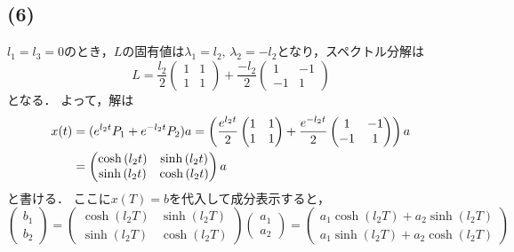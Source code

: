 \documentclass[a4paper,11pt]{jsarticle}
\begin{document}
\subsection*{(6)}
$l_1=l_3=0$のとき，$L$の固有値は$\lambda_1=l_2,\,\lambda_2=-l_2$となり，スペクトル分解は
\begin{equation}
  L = 
  \frac{l_2}{2}\left(
  \begin{matrix}
    1 & 1 \\
    1 & 1 
  \end{matrix}
  \right) + 
  \frac{-l_2}{2}\left(
  \begin{matrix}
    1 & -1 \\
    -1 & 1
  \end{matrix}
  \right)
\end{equation}
となる．
よって，解は
\begin{align}
  x(t) &= (e^{l_2 t}P_1 + e^{-l_2 t}P_2)a 
  = \left(\frac{e^{l_2 t}}{2}\left(
  \begin{matrix}
    1 & 1 \\
    1 & 1 
  \end{matrix}
  \right) + 
  \frac{e^{-l_2 t}}{2}\left(
  \begin{matrix}
    1 & -1 \\
    -1 & 1
  \end{matrix}
  \right)\right) a \notag\\
  &= \left(
    \begin{matrix}
      \cosh{(l_2 t)} & \sinh{(l_2 t)} \\
      \sinh{(l_2 t)} & \cosh{(l_2 t)}
    \end{matrix}
    \right)a
\end{align}
と書ける．
ここに$x(T)=b$を代入して成分表示すると，
\begin{equation}
  \left(
    \begin{matrix}
      b_1 \\
      b_2
    \end{matrix}
  \right)
  =
  \left(
    \begin{matrix}
      \cosh{(l_2 T)} & \sinh{(l_2 T)} \\
      \sinh{(l_2 T)} & \cosh{(l_2 T)}
    \end{matrix}
  \right)
  \left(
    \begin{matrix}
      a_1 \\
      a_2
    \end{matrix}
  \right)
  = 
  \left(
    \begin{matrix}
      a_1 \cosh{(l_2 T)} + a_2 \sinh{(l_2 T)}\\
      a_1 \sinh{(l_2 T)} + a_2 \cosh{(l_2 T)} 
    \end{matrix}
  \right)
\end{equation}
\end{document}
